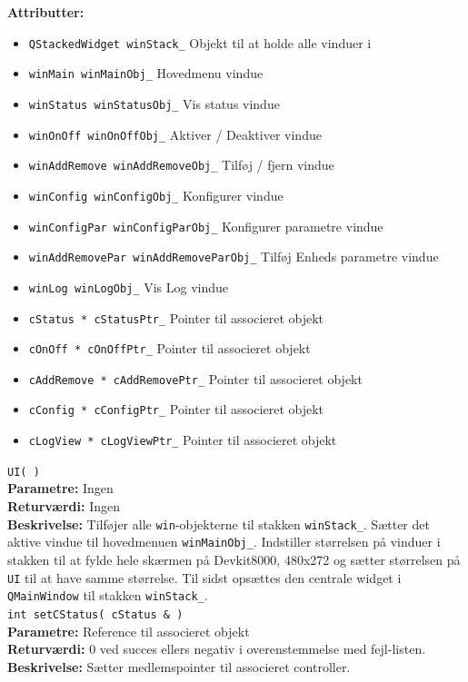 \textbf{Attributter:}
\begin{itemize}
	\item \verb+QStackedWidget winStack_+ Objekt til at holde alle vinduer i
	\item \verb+winMain winMainObj_+ Hovedmenu vindue
	\item \verb+winStatus winStatusObj_+ Vis status vindue
	\item \verb+winOnOff winOnOffObj_+ Aktiver / Deaktiver vindue
	\item \verb+winAddRemove winAddRemoveObj_+ Tilføj / fjern vindue
	\item \verb+winConfig winConfigObj_+ Konfigurer vindue
	\item \verb+winConfigPar winConfigParObj_+ Konfigurer parametre vindue
	\item \verb+winAddRemovePar winAddRemoveParObj_+ Tilføj Enheds parametre vindue
	\item \verb+winLog winLogObj_+ Vis Log vindue
	\item \verb+cStatus * cStatusPtr_+ Pointer til associeret objekt
	\item \verb+cOnOff * cOnOffPtr_+ Pointer til associeret objekt
	\item \verb+cAddRemove * cAddRemovePtr_+ Pointer til associeret objekt
	\item \verb+cConfig * cConfigPtr_+ Pointer til associeret objekt
	\item \verb+cLogView * cLogViewPtr_+ Pointer til associeret objekt
\end{itemize}

\verb+UI( )+\\
\textbf{Parametre:} Ingen \\
\textbf{Returværdi:} Ingen \\
\textbf{Beskrivelse:} Tilføjer alle \verb+win+-objekterne til stakken \verb+winStack_+. Sætter det aktive vindue til hovedmenuen \verb+winMainObj_+. Indstiller størrelsen på vinduer i stakken til at fylde hele skærmen på Devkit8000, 480x272 og sætter størrelsen på \verb+UI+ til at have samme størrelse. Til sidst opsættes den centrale widget i \verb+QMainWindow+ til stakken \verb+winStack_+.\\


\verb+int setCStatus( cStatus & )+\\
\textbf{Parametre:} Reference til associeret objekt \\
\textbf{Returværdi:} 0 ved succes ellers negativ i overenstemmelse med fejl-listen. \\
\textbf{Beskrivelse:} Sætter medlemspointer til associeret controller.\\

